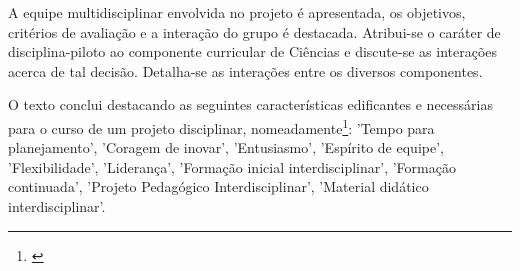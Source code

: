 \documentclass[
   article,       %
   12pt,          %
   oneside,       %
   a4paper,       %
   english,       %
   brazil,           %
   sumario=tradicional
   ]{abntex2}
\begin{document}
A equipe multidisciplinar envolvida no projeto é apresentada, os objetivos, critérios de avaliação e a interação do grupo é destacada. Atribui-se o caráter de disciplina-piloto ao componente curricular de Ciências e discute-se as interações acerca de tal decisão. Detalha-se as interações entre os diversos componentes.

O texto conclui destacando as seguintes características edificantes e necessárias para o curso de um projeto disciplinar, nomeadamente\footnote{\cite[p.12-14]{interdisciplinar_Duas_Culturas}}: 'Tempo para planejamento', 'Coragem de inovar', 'Entusiasmo', 'Espírito de equipe', 'Flexibilidade', 'Liderança', 'Formação inicial interdisciplinar', 'Formação continuada', 'Projeto Pedagógico Interdisciplinar', 'Material didático interdisciplinar'.

\postextual

\newpage


\end{document}
